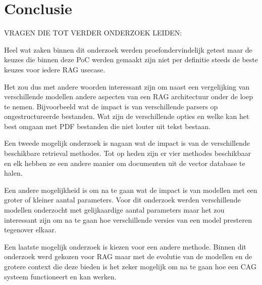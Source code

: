 
\chapter{Conclusie}%
\label{ch:conclusie}



VRAGEN DIE TOT VERDER ONDERZOEK LEIDEN:


Heel wat zaken binnen dit onderzoek werden proefondervindelijk getest maar de keuzes die binnen deze PoC werden gemaakt zijn niet per definitie steeds de beste keuzes voor iedere RAG usecase. 

Het zou dus met andere woorden interessant zijn om naast een vergelijking van verschillende modellen andere aspecten van een RAG architectuur onder de loep te nemen.
Bijvoorbeeld wat de impact is van verschillende parsers op ongestructureerde bestanden. Wat zijn de verschillende opties en welke kan het best omgaan met PDF bestanden die niet louter uit tekst bestaan. 

Een tweede mogelijk onderzoek is nagaan wat de impact is van de verschillende beschikbare retrieval methodes. Tot op heden zijn er vier methodes beschikbaar en elk hebben ze een andere manier om documenten uit de vector database te halen.

Een andere mogelijkheid is om na te gaan wat de impact is van modellen met een groter of kleiner aantal parameters. Voor dit onderzoek werden verschillende modellen onderzocht met gelijkaardige aantal parameters maar het zou interessant zijn om na te gaan hoe verschillende versies van een model presteren tegenover elkaar. 

Een laatste mogelijk onderzoek is kiezen voor een andere methode. Binnen dit onderzoek werd gekozen voor RAG maar met de evolutie van de modellen en de grotere context die deze bieden is het zeker mogelijk om na te gaan hoe een CAG systeem functioneert en kan werken.

